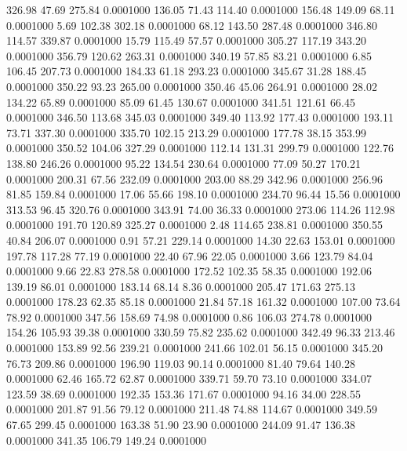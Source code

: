  326.98   47.69  275.84   0.0001000
 136.05   71.43  114.40   0.0001000
 156.48  149.09   68.11   0.0001000
   5.69  102.38  302.18   0.0001000
  68.12  143.50  287.48   0.0001000
 346.80  114.57  339.87   0.0001000
  15.79  115.49   57.57   0.0001000
 305.27  117.19  343.20   0.0001000
 356.79  120.62  263.31   0.0001000
 340.19   57.85   83.21   0.0001000
   6.85  106.45  207.73   0.0001000
 184.33   61.18  293.23   0.0001000
 345.67   31.28  188.45   0.0001000
 350.22   93.23  265.00   0.0001000
 350.46   45.06  264.91   0.0001000
  28.02  134.22   65.89   0.0001000
  85.09   61.45  130.67   0.0001000
 341.51  121.61   66.45   0.0001000
 346.50  113.68  345.03   0.0001000
 349.40  113.92  177.43   0.0001000
 193.11   73.71  337.30   0.0001000
 335.70  102.15  213.29   0.0001000
 177.78   38.15  353.99   0.0001000
 350.52  104.06  327.29   0.0001000
 112.14  131.31  299.79   0.0001000
 122.76  138.80  246.26   0.0001000
  95.22  134.54  230.64   0.0001000
  77.09   50.27  170.21   0.0001000
 200.31   67.56  232.09   0.0001000
 203.00   88.29  342.96   0.0001000
 256.96   81.85  159.84   0.0001000
  17.06   55.66  198.10   0.0001000
 234.70   96.44   15.56   0.0001000
 313.53   96.45  320.76   0.0001000
 343.91   74.00   36.33   0.0001000
 273.06  114.26  112.98   0.0001000
 191.70  120.89  325.27   0.0001000
   2.48  114.65  238.81   0.0001000
 350.55   40.84  206.07   0.0001000
   0.91   57.21  229.14   0.0001000
  14.30   22.63  153.01   0.0001000
 197.78  117.28   77.19   0.0001000
  22.40   67.96   22.05   0.0001000
   3.66  123.79   84.04   0.0001000
   9.66   22.83  278.58   0.0001000
 172.52  102.35   58.35   0.0001000
 192.06  139.19   86.01   0.0001000
 183.14   68.14    8.36   0.0001000
 205.47  171.63  275.13   0.0001000
 178.23   62.35   85.18   0.0001000
  21.84   57.18  161.32   0.0001000
 107.00   73.64   78.92   0.0001000
 347.56  158.69   74.98   0.0001000
   0.86  106.03  274.78   0.0001000
 154.26  105.93   39.38   0.0001000
 330.59   75.82  235.62   0.0001000
 342.49   96.33  213.46   0.0001000
 153.89   92.56  239.21   0.0001000
 241.66  102.01   56.15   0.0001000
 345.20   76.73  209.86   0.0001000
 196.90  119.03   90.14   0.0001000
  81.40   79.64  140.28   0.0001000
  62.46  165.72   62.87   0.0001000
 339.71   59.70   73.10   0.0001000
 334.07  123.59   38.69   0.0001000
 192.35  153.36  171.67   0.0001000
  94.16   34.00  228.55   0.0001000
 201.87   91.56   79.12   0.0001000
 211.48   74.88  114.67   0.0001000
 349.59   67.65  299.45   0.0001000
 163.38   51.90   23.90   0.0001000
 244.09   91.47  136.38   0.0001000
 341.35  106.79  149.24   0.0001000
